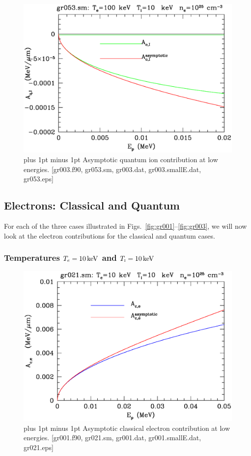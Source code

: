 \documentclass[preprint,12pt,eqsecnum,nofootinbib,amsmath,amssymb]{revtex4}
\newcommand{\smI}{{\rm\scriptscriptstyle I}}
\newcommand{\footnoteskip}{\baselineskip 12pt plus 1pt minus 1pt}
\begin{document}
\vskip-2cm 
\begin{figure}[h!]
\includegraphics[scale=0.45]{gr053.eps} 
\vskip-0.8cm 
\caption{\footnoteskip  
  Asymptotic quantum ion contribution at low energies. [gr003.f90,
  gr053.sm, gr003.dat, gr003.smallE.dat, gr053.eps] 
}
\label{fig:gr053}
\end{figure}


\pagebreak
\subsection{Electrons: Classical and Quantum}

For each of the three cases illustrated in
Figs.~\ref{fig:gr001}--\ref{fig:gr003}, we will now look at the
electron contributions for the classical and quantum cases.

\subsubsection{Temperatures $T_e=10\,{\rm keV}$ and $T_\smI=10\,{\rm keV}$}

\vskip-2cm 
\begin{figure}[h!]
\includegraphics[scale=0.45]{gr021.eps} 
\vskip-0.8cm 
\caption{\footnoteskip  
  Asymptotic classical electron contribution at low
  energies. [gr001.f90, gr021.sm, gr001.dat, gr001.smallE.dat,
  gr021.eps] 
}
\label{fig:gr021}
\end{figure}
\end{document}
